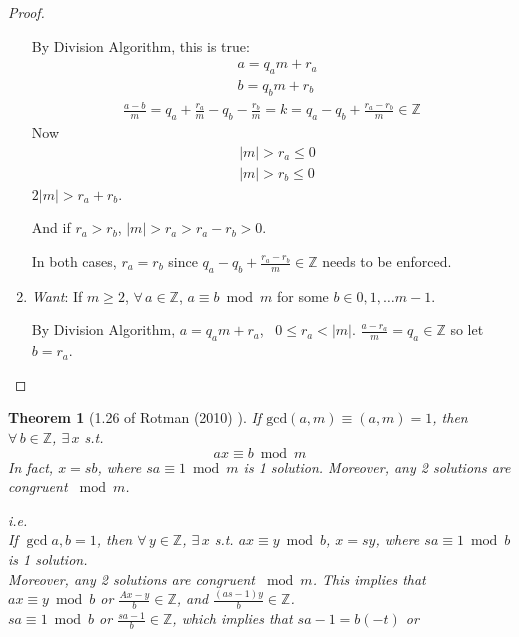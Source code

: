 \documentclass[10pt]{amsart}
\newtheorem{theorem}{Theorem}
\begin{document}
\begin{multicols*}{2}
\begin{proof}
\begin{enumerate}
	By Division Algorithm, this is true: 
	\[
	\begin{aligned}
	& a=q_a m + r_a \\ 
	 & b= q_b m + r_b 
	\end{aligned}
	\] 
	\[
	\begin{gathered}
	\frac{a-b}{m} = q_a + \frac{r_a}{m} - q_b - \frac{r_b}{m} = k = q_a - q_b + \frac{r_a - r_b}{m} \in \mathbb{Z}
	\end{gathered}
	\]
	Now 
	\[
	\begin{aligned}
	& |m| > r_a \leq 0 \\ 
	& |m| > r_b \leq 0 
	\end{aligned}
		\]
		$2|m| > r_a + r_b$.  
		
		And if $r_a > r_b$, $|m| > r_a > r_a -r_b > 0$.  
		
		In both cases, $r_a=r_b$ since $q_a - q_b + \frac{r_a - r_b}{m} \in \mathbb{Z}$ needs to be enforced.   
		
	\item \emph{Want}: If $m\geq 2$, $\forall \, a \in \mathbb{Z}$, $a \equiv b \bmod{m}$ for some $b\in 0,1,\dots m-1$.  
	
	By Division Algorithm, $a = q_a m + r_a$, \, $0 \leq r_a < |m|$.  $\frac{a-r_a}{m} = q_a \in \mathbb{Z}$ so let $b= r_a$.  
	
\end{enumerate}	
\end{proof}

\begin{theorem}[1.26 of Rotman (2010) \cite{JRotman2010}]\label{Thm:relprimeinvertible} 
If $\text{gcd}(a,m) \equiv (a,m) = 1$, then $\forall \, b \in \mathbb{Z}$, $\exists \, x $ s.t. 
\[
ax \equiv b\bmod{m}
\]
In fact, $x=sb$, where $sa\equiv 1\bmod{m}$ is 1 solution.  Moreover, any 2 solutions are congruent $\bmod{m}$.

i.e.  \\

If $\gcd{a,b} = 1$, then $\forall \, y \in \mathbb{Z}$, $\exists \, x$ s.t. $ax \equiv y \bmod{b}$, $x=sy$, where $sa\equiv 1\bmod{b}$ is 1 solution.  \\
Moreover, any 2 solutions are congruent $\bmod{m}$.  This implies that    \\

$ax\equiv y \bmod{b}$ or $\frac{Ax-y}{b} \in \mathbb{Z}$, and $\frac{(as-1)y }{b} \in \mathbb{Z}$.  \\
$sa \equiv 1 \bmod{b}$ or $\frac{sa-1}{b} \in \mathbb{Z}$, which implies that $sa-1 = b(-t)$ or 


\end{theorem}
\end{multicols*}
\end{document}
